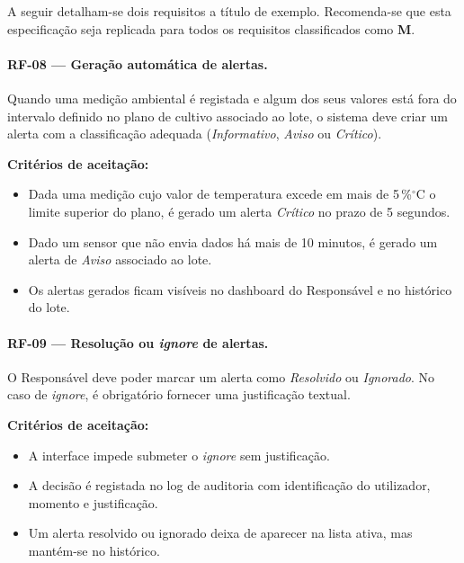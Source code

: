 
A seguir detalham-se dois requisitos a título de exemplo. Recomenda-se
que esta especificação seja replicada para todos os requisitos
classificados como \textbf{M}.

\paragraph{RF-08 — Geração automática de alertas.}
Quando uma medição ambiental é registada e algum dos seus valores
está fora do intervalo definido no plano de cultivo associado ao
lote, o sistema deve criar um alerta com a classificação adequada
(\emph{Informativo}, \emph{Aviso} ou \emph{Crítico}).

\textbf{Critérios de aceitação:}
\begin{itemize}
  \item Dada uma medição cujo valor de temperatura excede em mais de 5\,\%${}^{\circ}$C o limite superior do plano, é gerado um alerta \emph{Crítico} no prazo de 5 segundos.
  \item Dado um sensor que não envia dados há mais de 10 minutos, é gerado um alerta de \emph{Aviso} associado ao lote.
  \item Os alertas gerados ficam visíveis no dashboard do Responsável e no histórico do lote.
\end{itemize}

\paragraph{RF-09 — Resolução ou \emph{ignore} de alertas.}
O Responsável deve poder marcar um alerta como \emph{Resolvido} ou
\emph{Ignorado}. No caso de \emph{ignore}, é obrigatório fornecer
uma justificação textual.

\textbf{Critérios de aceitação:}
\begin{itemize}
  \item A interface impede submeter o \emph{ignore} sem justificação.
  \item A decisão é registada no log de auditoria com identificação do utilizador, momento e justificação.
  \item Um alerta resolvido ou ignorado deixa de aparecer na lista ativa, mas mantém-se no histórico.
\end{itemize}


